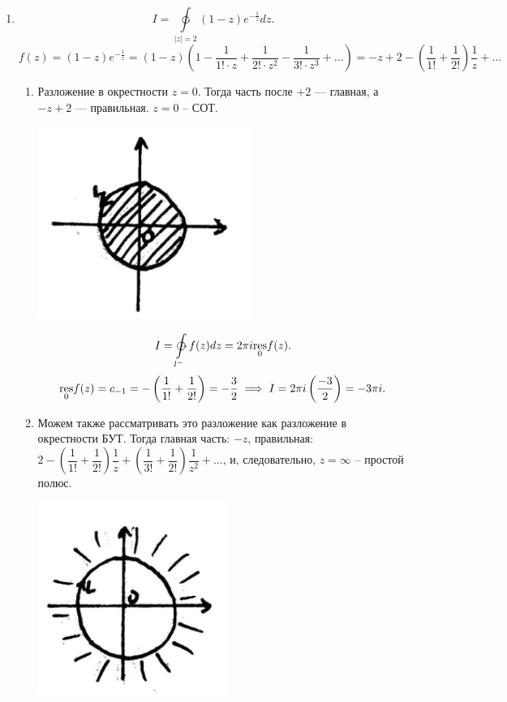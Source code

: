 \documentclass[../../main.tex]{subfiles}
\begin{document}
	 \begin{examples}
		\;
		
	 	\begin{enumerate}
	 		\item 
	 		\[
	 		I=\ointctrclockwise\limits_{|z|=2}(1-z)e^{-\frac1z}dz.
	 		\]
	 		\[
	 		f(z)=(1-z)e^{-\frac1z}=(1-z)(1- \dfrac{1}{1!\cdot z} +
	 		\dfrac{1}{2!\cdot z^2}- 
	 		\dfrac{1}{3!\cdot z^3}+\dots)
	 		=-z+2-\left( \dfrac{1}{1!} + \dfrac{1}{2!}
	 		\right)\dfrac{1}{z}+\dots
	 		\]
	 		
	 		\begin{enumerate}
	 			\item Разложение в окрестности $z=0$. Тогда часть после $+2$ --- главная, 
	 			а $-z+2$ --- правильная. $z=0$ -- СОТ.
	 			
	 			\begin{center}
	 			\includegraphics{lec35_3}
	 			\end{center}
	 			\[
	 			I=\ointctrclockwise\limits_{l^-}f(z)dz = 2\pi i \underset{0}{\res}f(z).
	 			\]
	 			\[
	 			\underset{0}{\operatorname{res}}f(z)=c_{-1}=-\left( \dfrac{1}{1!} + 
	 			\dfrac{1}{2!}\right)=
	 			-\dfrac{3}{2} \implies I=2\pi i \left( \dfrac{-3}{2}\right)=
	 			-3\pi i.
	 			\]
	 			\item Можем также рассматривать это разложение как разложение в 
	 			окрестности БУТ. Тогда главная часть: $-z$, правильная: 
	 			$2-\left( \dfrac{1}{1!} + \dfrac{1}{2!} \right)\dfrac{1}{z}+
	 			\left( \dfrac{1}{3!} + \dfrac{1}{2!} \right)\dfrac{1}{z^2}+\dots$, и, 
	 			следовательно, $z=\infty$ -- простой полюс.
	 			\begin{center}
	 			\includegraphics{lec35_4}

\end{center}
\end{enumerate}
\end{enumerate}
\end{examples}
\end{document}

